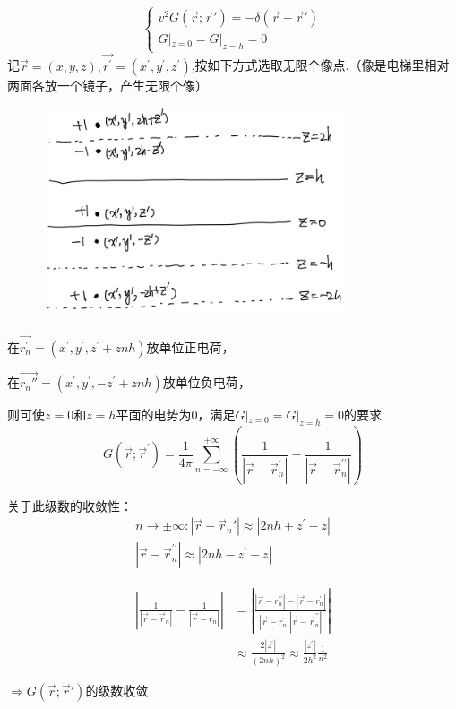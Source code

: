 \begin{ex}[层状空间$0<z<h$]
$$\begin{cases}
v^{2}G(\vec{r};\vec{r}')=-\delta(\vec{r}-\vec{r}')\\
G|_{z=0}=G|_{z=h}=0
\end{cases}$$
记$\vec{r}=(x,y,z),\vec{r^{\prime}}=(x^{\prime},y^{\prime},z^{\prime})$,按如下方式选取无限个像点.（像是电梯里相对两面各放一个镜子，产生无限个像）

\begin{figure}[htpb]
    \centering 
    \includegraphics[width=9cm]{figures/ElectricImage.png} 
    \label{ElectricImage}
\end{figure}

在$\vec{r_{n}^{\prime}}=(x^{\prime},y^{\prime},z^{\prime}+znh)$放单位正电荷，

在$\vec{r_{n}''}=(x^{\prime},y^{\prime},-z^{\prime}+znh)$放单位负电荷，

则可使$z=0$和$z=h$平面的电势为0，满足$G|_{z=0}=G|_{z=h}=0$的要求
$$G(\vec{r};\vec{r}^{\prime})=\frac{1}{4\pi}\sum_{n=-\infty}^{+\infty}(\frac{1}{|\vec{r}-\vec{r}_{n}^{\prime}|}-\frac{1}{|\vec{r}-\vec{r}_{n}^{\prime\prime}|})$$

关于此级数的收敛性：
$$\begin{aligned}
    n\to\pm\infty: |\vec{r}-\vec{r}_{n}'|\approx|2nh+z^{\prime}-z|\\
    |\vec{r}-\vec{r}_{n}^{\prime\prime}|\approx|2nh-z^{\prime}-z|
\end{aligned}$$

$$\begin{aligned}
|\frac{1}{|\vec{r}-\vec{r}_{n}|}-\frac{1}{|\vec{r}-r_{n}|}|
&=|\frac{|\vec{r}-r_{n}^{\prime\prime}|-|\vec{r}-r_{n}^{\prime}|}{|\vec{r}-r_{n}^{\prime}||\vec{r}-\vec{r}_{n}^{\prime\prime}|}|\\&\approx\frac{2|z^{\prime}|}{(2nh)^{2}}\approx\frac{|z^{\prime}|}{2h^{2}}\frac{1}{n^{2}}\end{aligned}$$

$\Rightarrow G(\vec{r};\vec{r}')$的级数收敛




\end{ex}


